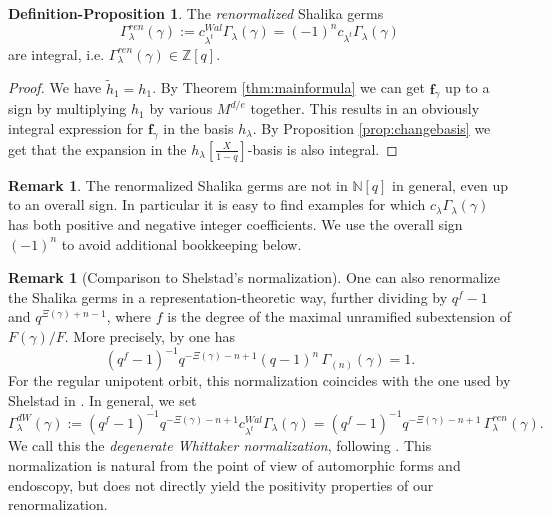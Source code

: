 \documentclass{amsart}
\numberwithin{equation}{section}
\theoremstyle{definition}
\newtheorem{remark}[lemma]{Remark}%
\newtheorem{defproposition}[lemma]{Definition-Proposition}
\def\tilde{\widetilde}
\renewcommand{\th}{\tilde{h}}
\newcommand{\fgamma}{\mathbf{f}_{\gamma}}
\newcommand{\N}{{\mathbb N}}
\newcommand{\Z}{{\mathbb Z}}
\begin{document}
\begin{defproposition}\label{defprop:renormalized}
The {\em renormalized} Shalika germs $$\Gamma^{ren}_{\lambda}(\gamma):=c^{Wal}_{\lambda^t} \Gamma_\lambda(\gamma)=(-1)^nc_{\lambda^t}\Gamma_\lambda(\gamma)$$ are integral, i.e. $\Gamma^{ren}_{\lambda}(\gamma)\in \Z[q]$.
\end{defproposition}
\begin{proof}
    We have $\th_1=h_1$. By Theorem \ref{thm:mainformula} we can get $\fgamma$ up to a sign by multiplying $h_1$ by various $M^{d/e}$ together. This results in an obviously integral expression for $\fgamma$ in the basis $h_\lambda$. By Proposition \ref{prop:changebasis} we get that the expansion in the $h_\lambda\left[\frac{X}{1-q}\right]$-basis is also integral.
\end{proof}
\begin{remark}
The renormalized Shalika germs are not in $\N[q]$ in general, even up to an overall sign. In particular it is easy to find examples for which $c_\lambda \Gamma_\lambda(\gamma)$ has both positive and negative integer coefficients. We use the overall sign $(-1)^n$ to avoid additional bookkeeping below.
\end{remark}


\begin{remark}[Comparison to Shelstad's normalization]\label{rmk:shelstad}
One can also renormalize the Shalika germs in a representation-theoretic way, further dividing by $q^f-1$ and $q^{\Xi(\gamma)+n-1}$, where $f$ is the degree of the maximal unramified subextension of $F(\gamma)/F$. More precisely, by 
\cite[Eq. (3.6)]{Tsai20} one has
$$(q^f-1)^{-1}q^{-\Xi(\gamma)-n+1}(q-1)^n\,\Gamma_{(n)}(\gamma)=1.$$ For the regular unipotent orbit, this normalization coincides with the one used by Shelstad in \cite{Shelstad}. In general, we set 
$$\Gamma^{dW}_{\lambda}(\gamma):=(q^f-1)^{-1}q^{-\Xi(\gamma)-n+1}c^{Wal}_{\lambda^t}\Gamma_{\lambda}(\gamma)=(q^f-1)^{-1}q^{-\Xi(\gamma)-n+1}\,\Gamma^{ren}_\lambda(\gamma).$$
We call this the {\em degenerate Whittaker normalization}, following \cite{MW87,Shelstad}. This normalization is natural from the point of view of automorphic forms and endoscopy, but does not directly yield the positivity properties of our renormalization.
\end{remark}
\end{document}
